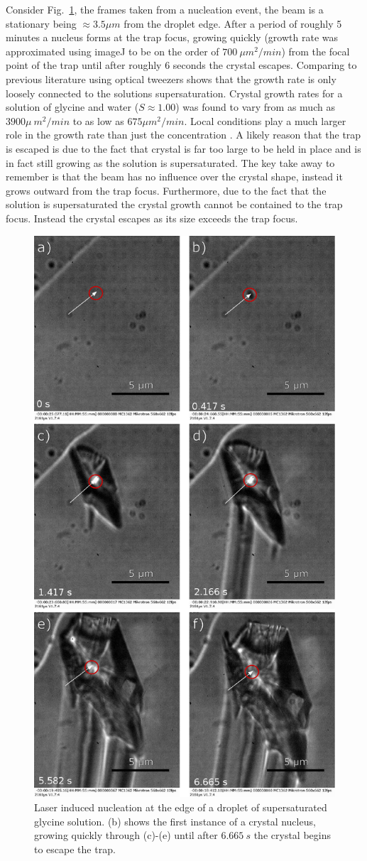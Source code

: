 Consider Fig.~\ref{fig:stationary_beam}, the frames taken from 
a nucleation event, the beam is a stationary being $\approx3.5 
\mu m$ from the droplet edge. After a period of roughly 5 minutes 
a nucleus forms at the trap focus, growing quickly (growth rate 
was approximated using imageJ to be on the order of $700\ \mu 
m^2/min$) from the focal point of the trap until after roughly 
$6$ seconds the crystal escapes. Comparing to previous literature
using optical tweezers shows that the growth rate is only loosely 
connected to the solutions supersaturation. Crystal growth rates 
for a solution of glycine and water ($S\approx1.00$) was found to
vary from as much as $3900 \mu\ m^2/min$ to as low as $675\mu 
m^2/min$. Local conditions play a much larger role in the growth 
rate than just the concentration \cite{Flannigan2023}. A likely 
reason that the trap is escaped is due to the fact that crystal 
is far too large to be held in place and is in fact still growing 
as the solution is supersaturated. The key take away to remember 
is that the beam has no influence over the crystal shape, instead 
it grows outward from the trap focus. Furthermore, due to the fact 
that the solution is supersaturated the crystal growth cannot be 
contained to the trap focus. Instead the crystal escapes as its 
size exceeds the trap focus. 
\begin{figure}[h!]
	\centering
	\includegraphics[width=0.75\linewidth, height=1.1\linewidth]{frames_no_beam_movement.pdf}
	\caption{Laser induced nucleation at the edge of a droplet of supersaturated 
	glycine solution. (b) shows the first instance of a crystal nucleus, growing 
	quickly through (c)-(e) until after $6.665\ s$ the crystal begins to escape 
	the trap.}
	\label{fig:stationary_beam}
\end{figure}

